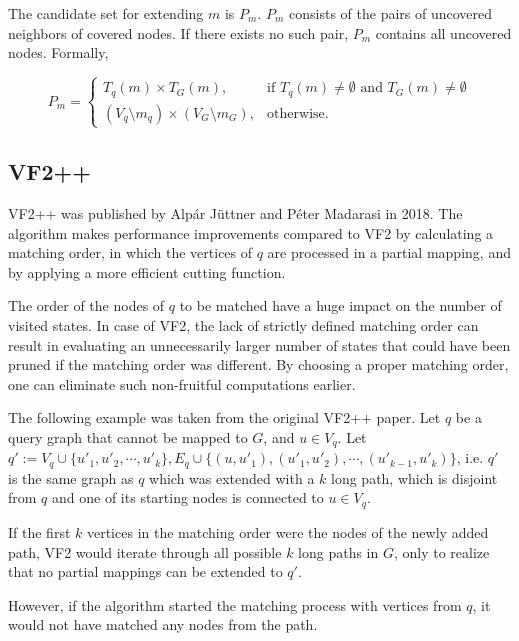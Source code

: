 The candidate set for extending $m$ is $P_m$. $P_m$ consists of the pairs of uncovered neighbors
of covered nodes. If there exists no such pair, $P_m$ contains all uncovered nodes. Formally,

\[
    P_m = 
\begin{cases}
    T_q(m) \times T_G(m),& \text{if } T_q(m) \neq \emptyset \text{ and } T_G(m) \neq \emptyset\\
    (V_q \setminus m_q) \times (V_G \setminus m_G),  & \text{otherwise}.
\end{cases}    
\]


\subsection{VF2++}

VF2++ \cite{vf2pp} was published by Alp\'{a}r J\"{u}ttner and P\'{e}ter Madarasi in 2018.
The algorithm makes performance improvements compared to VF2 by calculating a matching
order, in which the vertices of $q$ are processed in a partial mapping, and by applying
a more efficient cutting function.

The order of the nodes of $q$ to be matched have a huge impact on the number of visited
states. In case of VF2, the lack of strictly defined matching order can result in evaluating 
an unnecessarily larger number of states that could have been pruned if the matching order was
different. By choosing a proper matching order, one can eliminate such non-fruitful computations earlier.

\begin{example}
    The following example was taken from the original VF2++ paper. Let $q$ be a query graph 
    that cannot be mapped to $G$, and $u \in V_q$. Let 
    $q' := V_q \cup \{u'_1, u'_2,\cdots,u'_k\}, E_q \cup \{ (u, u'_1),(u'_1, u'_2),\cdots,(u'_{k-1}, u'_k) \}$,
    i.e. $q'$ is the same graph as $q$ which was extended with a $k$ long path, which is disjoint
    from $q$ and one of its starting nodes is connected to $u \in V_q$.

    If the first $k$ vertices in the matching order were the nodes of the newly added path,
    VF2 would iterate through all possible $k$ long paths in $G$, only to realize that no
    partial mappings can be extended to $q'$.

    However, if the algorithm started the matching process with vertices from $q$, it would not have
    matched any nodes from the path.
\end{example}


